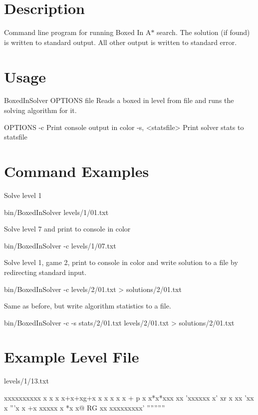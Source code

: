 \hypertarget{viewsolution_page_description_sec}{}\section{Description}\label{viewsolution_page_description_sec}
Command line program for running Boxed In A$\ast$ search. The solution (if found) is written to standard output. All other output is written to standard error.\hypertarget{viewsolution_page_usage_sec}{}\section{Usage}\label{viewsolution_page_usage_sec}
\begin{DoxyVerb}BoxedInSolver OPTIONS file
    Reads a boxed in level from file and runs the solving
    algorithm for it.

    OPTIONS
        -c
            Print console output in color
        -s, <statsfile>
            Print solver stats to statsfile\end{DoxyVerb}
\hypertarget{viewsolution_page_examples_sec}{}\section{Command Examples}\label{viewsolution_page_examples_sec}
Solve level 1

\begin{DoxyVerb}bin/BoxedInSolver levels/1/01.txt\end{DoxyVerb}


Solve level 7 and print to console in color

\begin{DoxyVerb}bin/BoxedInSolver -c levels/1/07.txt\end{DoxyVerb}


Solve level 1, game 2, print to console in color and write solution to a file by redirecting standard input.

\begin{DoxyVerb}bin/BoxedInSolver -c levels/2/01.txt > solutions/2/01.txt\end{DoxyVerb}


Same as before, but write algorithm statistics to a file.

\begin{DoxyVerb}bin/BoxedInSolver -c -s stats/2/01.txt levels/2/01.txt > solutions/2/01.txt\end{DoxyVerb}
\hypertarget{viewsolution_page_example_level_file_sec}{}\section{Example Level File}\label{viewsolution_page_example_level_file_sec}
levels/1/13.\+txt

\begin{DoxyVerb}xxxxxxxxxx
x        x
x x+x+xg+x
x x x    x
x +   p  x
x*x*xxx xx
'xxxxxx x'
xr    x xx
'xx      x
'''x  x +x
xxxxx x *x
x@ RG   xx
xxxxxxxxx'
''''''''''\end{DoxyVerb}
 
